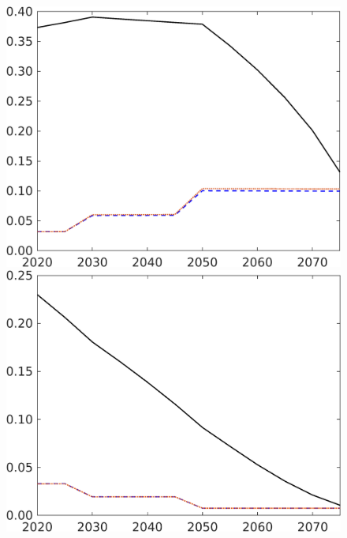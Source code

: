 \begin{figure}[h!!]
\begin{minipage}[]{0.32\textwidth}
	\end{minipage}
	\begin{minipage}[]{0.32\textwidth}
		\includegraphics[width=1\textwidth]{../../codding_model/own_basedOnFried/optimalPol_elastS_DisuSci/figures/all_1705/sg_CompEffOPT_T_NoTaus_spillover0_sep1_BN0_ineq0_red0_etaa0.79_lgd0.png}
	\end{minipage}
	\begin{minipage}[]{0.32\textwidth}
	\includegraphics[width=1\textwidth]{../../codding_model/own_basedOnFried/optimalPol_elastS_DisuSci/figures/all_1705/sff_CompEffOPT_T_NoTaus_spillover0_sep1_BN0_ineq0_red0_etaa0.79_lgd0.png}

\end{minipage}
\end{figure}
